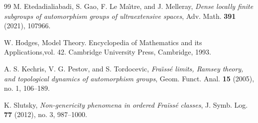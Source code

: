 \begin{thebibliography}{99}
M. Etedadialiabadi, S. Gao, F. Le Ma\^{\i}tre, and J. Melleray,
\textit{Dense locally finite subgroups of automorphism groups of ultraextensive spaces},
Adv. Math. {\bf 391} (2021), 107966.

W. Hodges, 
Model Theory. Encyclopedia of Mathematics and its Applications,vol. 42.
 Cambridge University Press, Cambridge, 1993.

A. S. Kechris, V. G. Pestov, and S. Tordocevic,
\textit{Fra\"{\i}ss\'{e} limits, Ramsey theory, and topological dynamics of automorphism groups},
Geom. Funct. Anal. {\bf 15} (2005), no. 1, 106--189.

K. Slutsky,
\textit{Non-genericity phenomena in ordered Fra\"iss\'e classes},
J. Symb. Log. {\bf 77} (2012), no. 3, 987--1000.
\end{thebibliography}
